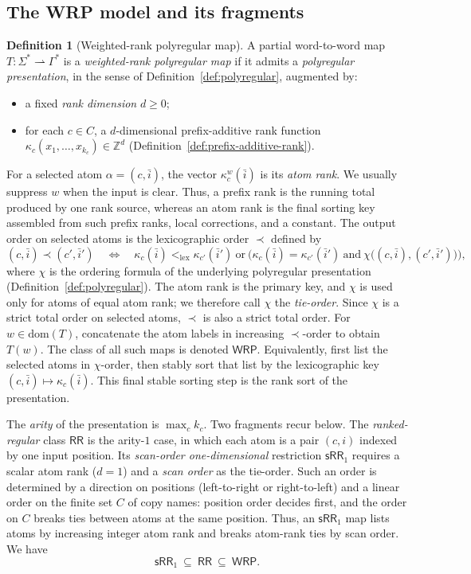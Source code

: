 \documentclass[11pt]{article}
\theoremstyle{definition}
\newtheorem{definition}[theorem]{Definition}
\newcommand{\Z}{\mathbb Z}
\newcommand{\WRP}{\mathsf{WRP}}
\newcommand{\RR}{\mathsf{RR}}
\newcommand{\SWR}{\mathsf{sRR}_1}
\begin{document}
\subsection{The WRP model and its fragments}

\begin{definition}[Weighted-rank polyregular map]\label{def:wrp}
A partial word-to-word map $T\colon\Sigma^*\rightharpoonup\Gamma^*$ is a
\emph{weighted-rank polyregular map} if it admits a \emph{polyregular
presentation}, in the sense of Definition~\ref{def:polyregular}, augmented by:
\begin{itemize}
\item a fixed \emph{rank dimension} $d\ge 0$;
\item for each $c\in C$, a $d$-dimensional prefix-additive rank function
$\kappa_c(x_1,\ldots,x_{k_c})\in\Z^d$
(Definition~\ref{def:prefix-additive-rank}).
\end{itemize}
For a selected atom $\alpha=(c,\bar i)$, the vector
$\kappa_c^w(\bar i)$ is its \emph{atom rank}.  We usually suppress $w$ when
the input is clear.  Thus, a prefix rank is the running total produced by one
rank source, whereas an atom rank is the final sorting key assembled from such
prefix ranks, local corrections, and a constant.
The output order on selected atoms is the lexicographic order $\prec$
defined by
\[
   (c,\bar i)\prec(c',\bar i')
   \quad\iff\quad
   \kappa_c(\bar i)<_{\mathrm{lex}}\kappa_{c'}(\bar i')
   \ \text{or}\
   \bigl(\kappa_c(\bar i)=\kappa_{c'}(\bar i')\ \text{and}\
          \chi\bigl((c,\bar i),(c',\bar i')\bigr)\bigr),
\]
where $\chi$ is the ordering formula of the underlying polyregular
presentation (Definition~\ref{def:polyregular}).  The atom rank is the primary
key, and $\chi$ is used only for atoms of equal atom rank; we therefore call
$\chi$ the \emph{tie-order}.  Since $\chi$ is a strict total order on selected atoms,
$\prec$ is also a strict total order.  For $w\in\mathrm{dom}(T)$, concatenate
the atom labels in increasing $\prec$-order to obtain $T(w)$.  The class of
all such maps is denoted $\WRP$.  Equivalently, first list the selected atoms
in $\chi$-order, then stably sort that list by the lexicographic key
$(c,\bar i)\mapsto\kappa_c(\bar i)$.  This final stable sorting step is the
rank sort of the presentation.

The \emph{arity} of the presentation is $\max_c k_c$.  Two fragments recur
below.  The \emph{ranked-regular} class $\RR$ is the arity-$1$ case, in which
each atom is a pair $(c,i)$ indexed by one input position.  Its
\emph{scan-order one-dimensional} restriction $\SWR$ requires a scalar atom rank
($d=1$) and a \emph{scan order} as the tie-order.  Such an order is determined
by a direction on positions (left-to-right or right-to-left) and a linear order
on the finite set $C$ of copy names: position order decides first, and the order
on $C$ breaks ties between atoms at the same position.  Thus, an $\SWR$ map lists atoms by
increasing integer atom rank and breaks atom-rank ties by scan order.  We have
\[
   \SWR\ \subseteq\ \RR\ \subseteq\ \WRP.
\]
\end{definition}
\end{document}

